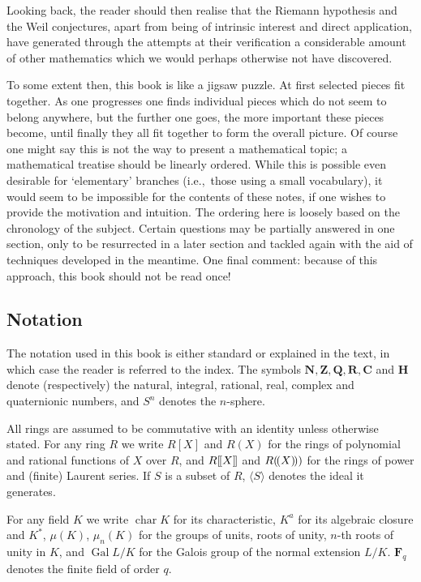 \documentclass[10pt,leqno]{article}
\theoremstyle{definition}
\def\ldb{[\mkern-2mu[}
\def\rdb{]\mkern-2mu]}
\def\ldp{(\mkern-2.5mu(}
\def\rdp{)\mkern-2.5mu)}
\def\NN{\mathbf{N}}
\def\ZZ{\mathbf{Z}}
\def\QQ{\mathbf{Q}}
\def\RR{\mathbf{R}}
\def\CC{\mathbf{C}}
\def\HH{\mathbf{H}}
\def\FF{\mathbf{F}}
\DeclareMathOperator{\chr}{char}
\DeclareMathOperator{\Gal}{Gal}
\def\qw#1{`#1'}
\begin{document}
Looking back, the reader should then realise that the Riemann hypothesis and the Weil conjectures, apart from being of intrinsic interest and direct application, have generated through the attempts at their verification a considerable amount of other mathematics which we would perhaps otherwise not have discovered.

To some extent then, this book is like a jigsaw puzzle.
At first selected pieces fit together.
As one progresses one finds individual pieces which do not seem to belong anywhere, but the further one goes, the more important these pieces become, until finally they all fit together to form the overall picture.
Of course one might say this is not the way to present a mathematical topic; a mathematical treatise should be linearly ordered.
While this is possible even desirable for \qw{elementary} branches (i.e.,~those using a small vocabulary), it would seem to be impossible for the contents of these notes, if one wishes to provide the motivation and intuition.
The ordering here is loosely based on the chronology of the subject.
Certain questions may be partially answered in one section, only to be resurrected in a later section and tackled again with the aid of techniques developed in the meantime.
One final comment: because of this approach, this book should not be read once!


\subsection*{Notation}

The notation used in this book is either standard or explained in the text, in which case the reader is referred to the index.
The symbols $\NN, \ZZ, \QQ, \RR, \CC$ and $\HH$ denote (respectively) the natural, integral, rational, real, complex and quaternionic numbers, and $S^n$ denotes the $n$-sphere.

All rings are assumed to be commutative with an identity unless otherwise stated.
For any ring $R$ we write $R[X]$ and $R(X)$ for the rings of polynomial and rational functions of $X$ over $R$, and $R\ldb X \rdb$ and $R\ldp X \rdp)$ for the rings of power and (finite) Laurent series.
If $S$ is a subset of $R$, $\langle S \rangle$ denotes the ideal it generates.

For any field $K$ we write $\chr K$ for its characteristic, $K^a$ for its algebraic closure and $K^*$, $\mu(K)$, $\mu_n(K)$ for the groups of units, roots of unity, $n$-th roots of unity in $K$, and $\Gal L/K$ for the Galois group of the normal extension $L/K$.
$\FF_q$ denotes the finite field of order $q$.
\end{document}
